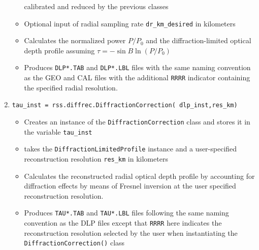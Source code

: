 \documentclass[titlepage, 12pt]{article}
\begin{document}
\begin{enumerate}
\begin{itemize}
                                calibrated and reduced by the previous classes 
                          \item Optional input of radial sampling rate
                                \texttt{dr\_km\_desired} in kilometers
                          \item Calculates the normalized power $P/P_0$
                                and the diffraction-limited
                                optical depth profile assuming
                                $\tau=-\sin B\ln (P/P_0)$ 
                          \item Produces \texttt{DLP*.TAB} and
                                \texttt{DLP*.LBL} files with the same
                                naming convention as the GEO and CAL files
                                with the additional \texttt{RRRR} indicator containing the specified radial resolution.
                      \end{itemize}
                \item \small{\texttt{tau\_inst =
                                     rss.diffrec.DiffractionCorrection(
                                     dlp\_inst,res\_km)}}
                      \normalsize
                      \begin{itemize}
                          \item Creates an instance of the
                                \texttt{DiffractionCorrection} class and
                                stores it in the variable \texttt{tau\_inst} 
                          \item takes the \texttt{DiffractionLimitedProfile}
                                instance and a user-specified reconstruction
                                resolution \texttt{res\_km} in kilometers
                          \item Calculates the reconstructed radial optical depth profile 
                                by accounting for diffraction
                                effects by means of Fresnel inversion at the
                                user specified reconstruction resolution.
                          \item Produces \texttt{TAU*.TAB} and
                                \texttt{TAU*.LBL} files following the same
                                naming convention as the DLP files except
                                that \texttt{RRRR} here indicates the
                                reconstruction resolution selected by
                                the user when instantiating the
                                \texttt{DiffractionCorrection()} class
                      \end{itemize}
            \end{enumerate}
\end{document}
